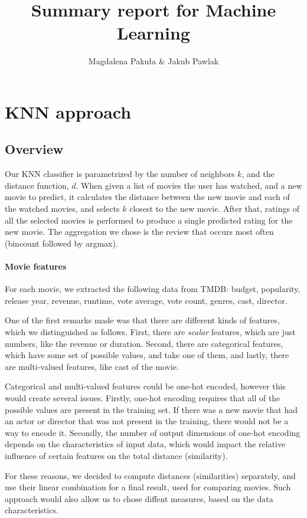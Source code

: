 \documentclass[a4paper,9pt]{article}
\title{\vspace*{-1in}Summary report for Machine Learning}
\author{Magdalena Pakuła \& Jakub Pawlak}
\date{}
\begin{document}
\maketitle


\section{KNN approach}
\subsection{Overview}

Our KNN classifier is parametrized by the number of neighbors $k$, and the distance function, $d$.
When given a list of movies the user has watched, and a new movie to predict, it calculates the distance between the new movie and each of the watched movies, and selects $k$ closest to the new movie.
After that, ratings of all the selected movies is performed to produce a single predicted rating for the new movie.
The aggregation we chose is the review that occurs most often (bincount followed by argmax).

\paragraph{Movie features}
For each movie, we extracted the following data from TMDB:
budget, popularity, release year, revenue, runtime, vote average, vote count, genres, cast, director.

One of the first remarks made was that there are different kinds of features, which we distinguished as follows.
First, there are \emph{scalar} features, which are just numbers, like the revenue or duration.
Second, there are categorical features, which have some set of possible values, and take one of them,
and lastly, there are multi-valued features, like cast of the movie.

Categorical and multi-valued features could be one-hot encoded, however this would create several issues.
Firstly, one-hot encoding requires that all of the possible values are present in the training set.
If there was a new movie that had an actor or director that was not present in the training, there would not be a way to encode it.
Secondly, the number of output dimensions of one-hot encoding depends on the characteristics of input data, which would impact the relative influence of certain features on the total distance (similarity).

For these reasons, we decided to compute distances (similarities) separately, and use their linear combination for a final result, used for comparing movies. Such approach would also allow us to chose diffent measures, based on the data characteristics.
\end{document}
